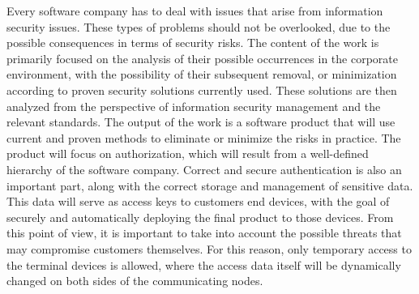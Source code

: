 \newpage
\thispagestyle{plain}
Every software company has to deal with issues that arise from information security issues.
These types of problems should not be overlooked, due to the possible consequences in terms of security risks.
The content of the work is primarily focused on the analysis of their possible occurrences in the corporate environment,
with the possibility of their subsequent removal, or minimization according to proven security solutions currently used.
These solutions are then analyzed from the perspective of information security management and the relevant standards.
The output of the work is a software product that will use current and proven methods to eliminate or minimize the risks in practice.
The product will focus on authorization, which will result from a well-defined hierarchy of the software company.
Correct and secure authentication is also an important part, along with the correct storage and management of sensitive data.
This data will serve as access keys to customers end devices, with the goal of securely and automatically deploying
the final product to those devices.
From this point of view, it is important to take into account the possible threats that may compromise customers themselves.
For this reason, only temporary access to the terminal devices is allowed, where the access data itself will be dynamically
changed on both sides of the communicating nodes.
\emptypage
